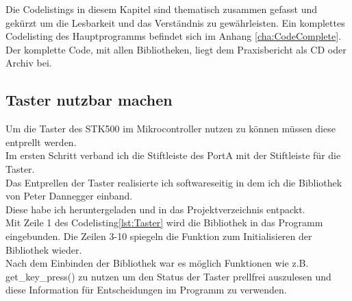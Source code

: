 \begin{Tipp}
Die Codelistings in diesem Kapitel sind thematisch zusammen gefasst und gekürzt um die Lesbarkeit
und das Verständnis zu gewährleisten. Ein komplettes Codelisting des Hauptprogramms befindet
sich im Anhang \ref{cha:CodeComplete}. Der komplette Code, mit allen Bibliotheken, liegt dem Praxisbericht
als CD oder Archiv bei.
\end{Tipp}

\subsection{Taster nutzbar machen}
\label{sec:Taster}
Um die Taster des STK500 im Mikrocontroller nutzen zu können müssen diese entprellt werden.\\
Im ersten Schritt verband ich die Stiftleiste des PortA mit der Stiftleiste für die Taster.\\
Das Entprellen der Taster realisierte ich softwareseitig in dem ich die Bibliothek \cite{uC:Dannegger} von Peter Dannegger einband.\\
Diese habe ich heruntergeladen und in das Projektverzeichnis entpackt.\\
Mit Zeile 1 des Codelisting\ref{lst:Taster} wird die Bibliothek in das Programm eingebunden. Die Zeilen 3-10 spiegeln die Funktion zum Initialisieren der Bibliothek wieder.\\
Nach dem Einbinden der Bibliothek war es möglich Funktionen wie z.B. get\_key\_press() zu nutzen um den Status der Taster prellfrei auszulesen und diese Information für Entscheidungen im Programm zu verwenden. 

\lstset{language=C, basicstyle=\footnotesize, showstringspaces=false, tabsize=8}


